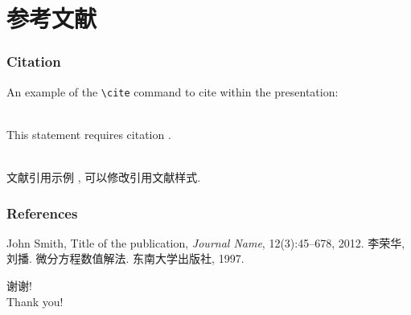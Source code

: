 \section{参考文献}

\begin{frame}[fragile] %
\frametitle{Citation}
An example of the \verb|\cite| command to cite within the presentation:\\~

This statement requires citation \cite{Smith2012}. \\~

文献引用示例 \cite{LiLiu1997}, 可以修改引用文献样式.
\end{frame}


\begin{frame}
\frametitle{References}
\footnotesize{
\begin{thebibliography}{99} %
 John Smith, Title of the publication, \emph{Journal Name}, 12(3):45--678, 2012.
 李荣华, 刘播. 微分方程数值解法. 东南大学出版社, 1997.
\end{thebibliography}
}
\end{frame}




\begin{frame}
\HUGE 谢\quad 谢! \\[8pt]
Thank you!
\end{frame}